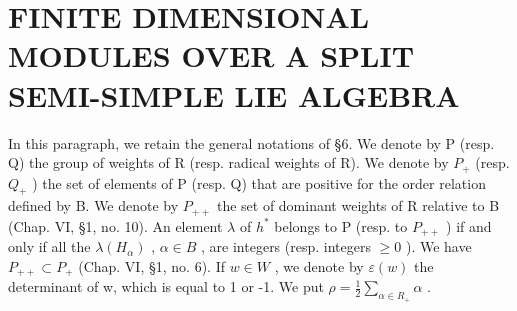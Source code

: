 \section{FINITE DIMENSIONAL MODULES OVER A SPLIT SEMI-SIMPLE LIE ALGEBRA}

In this paragraph, we retain the general notations of §6. We denote by P (resp. Q) the group of weights of R (resp. radical weights of R). We denote by \(P_{+}\) (resp. \(Q_{+}\) ) the set of elements of P (resp. Q) that are positive for the order relation defined by B. We denote by \(P_{++}\) the set of dominant weights of R relative to B (Chap. VI, §1, no. 10). An element \(\lambda\) of \(h^{*}\) belongs to P (resp. to \(P_{++}\) ) if and only if all the \(\lambda(H_{\alpha})\) , \(\alpha \in B\) , are integers (resp. integers \(\geq 0\) ). We have \(P_{++} \subset P_{+}\) (Chap. VI, §1, no. 6). If \(w \in W\) , we denote by \(\varepsilon(w)\) the determinant of w, which is equal to 1 or -1. We put \(\rho = \frac{1}{2} \sum_{\alpha \in R_{+}} \alpha\) .
\relax{}
